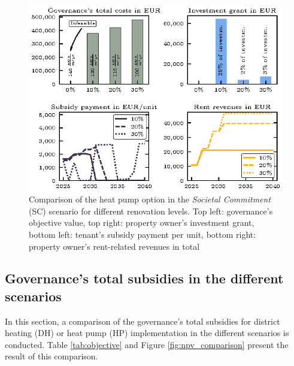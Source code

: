 \begin{figure}[h]
	\centering
	\includegraphics[width=0.95\linewidth]{figures/4_Results/fig_retrofitting/retrofitting.eps}
	\caption{Comparison of the heat pump option in the \textit{Societal Commitment} (SC) scenario for different renovation levels. Top left: governance's objective value, top right: property owner's investment grant, bottom left: tenant's subsidy payment per unit, bottom right: property owner's rent-related revenues in total}
	\label{fig:retrofitting}
\end{figure}

\subsection{Governance's total subsidies in the different scenarios}\label{res:overview}
In this section, a comparison of the governance's total subsidies for district heating (DH) or heat pump (HP) implementation in the different scenarios is conducted. Table \ref{tab:objective} and Figure \ref{fig:npv_comparison} present the result of this comparison. 

